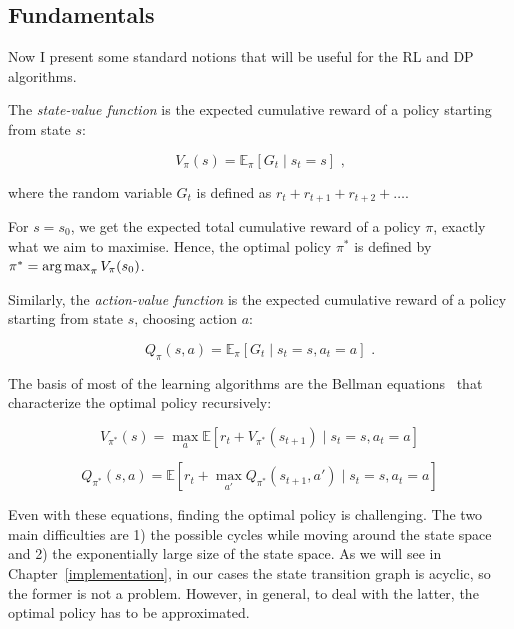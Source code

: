 \subsection{Fundamentals}

Now I present some standard notions that will be useful for the RL and DP algorithms.


The \textit{state-value function} is the expected cumulative reward of a policy starting from state $s$:

\begin{equation}\label{eq:statevalueFunction}
V_{\pi}(s)=\mathbb{E}_\pi[G_t \mid s_t = s] \text{ ,}
\end{equation}

where the random variable $G_t$ is defined as $r_{t} +  r_{t+1} + r_{t+2} + \ldots$.

For $s=s_0$, we get the expected total cumulative reward of a policy $\pi$, exactly what we aim to maximise. Hence, the optimal policy $\pi^*$ is defined by $\pi^* = \operatorname*{arg\,max}_{\pi} V_{\pi}(s_0)$.


Similarly, the \textit{action-value function} is the expected cumulative reward of a policy starting from state $s$, choosing action $a$:

\begin{equation}\label{eq:actionvalueFunction}
Q_{\pi}(s, a)=\mathbb{E}_\pi[G_t \mid s_t = s, a_t = a] \text{ .}
\end{equation}


The basis of most of the learning algorithms are the Bellman equations~\cite{bellman1957bellmanequation} that characterize the optimal policy recursively:


\begin{equation}\label{eq:bellmanState}
V_{\pi^*}(s) = \max_a \mathbb{E} [r_t + V_{\pi^*}(s_{t+1}) \mid s_t=s, a_t=a]
\end{equation}


\begin{equation} \label{eq:bellmanAction}
Q_{\pi^*}(s,a) = \mathbb{E} [r_t + \max_{a'} Q_{\pi^*}(s_{t+1},a') \mid s_t=s, a_t=a ] 
\end{equation}


Even with these equations, finding the optimal policy is challenging. The two main difficulties are 1) the possible cycles while moving around the state space and 2) the exponentially large size of the state space. As we will see in Chapter~\ref{implementation}, in our cases the state transition graph is acyclic, so the former is not a problem. However, in general, to deal with the latter, the optimal policy has to be approximated.




